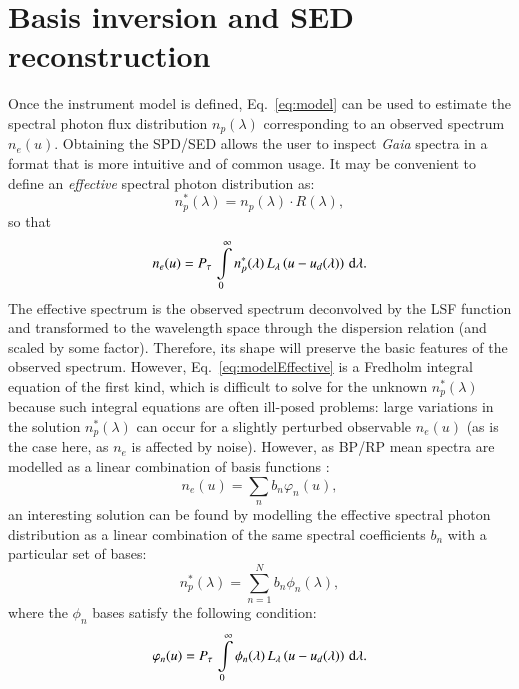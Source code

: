 \documentclass{aa}
\newcommand{\gaia}{\textit{Gaia}\xspace}
\newcommand{\pupil}{\ensuremath{P_\tau}}
\newcommand{\equref}[1]{Eq.~\ref{eq:#1}}
\begin{document}

\section{Basis inversion and SED reconstruction}\label{sec:basisInversion}

Once the instrument model is defined, \equref{model} can be used to estimate the spectral photon flux distribution $n_p(\lambda)$ corresponding to an observed spectrum $n_e(u)$. 
Obtaining the SPD/SED allows the user to inspect \gaia spectra in a format that is more intuitive and of common usage.
It may be convenient to define an 
\emph{effective} spectral photon distribution as:
\begin{equation}
    n_p^*(\lambda) = n_p(\lambda) \cdot R(\lambda)
    \label{eq:effective}
,\end{equation}
so that
\begin{equation}
\label{eq:modelEffective}
n_{e}(u)=  \pupil\, \int\limits_0^\infty n_p^*(\lambda) \, L_\lambda\left(u - u_d(\lambda)\right) \, {\rm d}\lambda
.\end{equation}
The effective spectrum is the observed spectrum deconvolved by the LSF function and transformed to the wavelength space through the dispersion relation (and scaled by some factor). Therefore, its shape will preserve the basic features of the observed spectrum.
However, \equref{modelEffective} is a Fredholm integral equation of the first kind, which is difficult to solve for the unknown $n_p^*(\lambda)$ because such integral equations are often ill-posed problems: large variations in the solution $n_p^*(\lambda)$ can occur for a slightly perturbed observable $n_{e}(u)$ (as is the case here, as   $n_e$ is affected by noise). 
 However, as BP/RP mean spectra are modelled as a linear combination of basis functions \citep{Carrasco2021}:
\begin{equation}
    n_e(u) = \sum_n b_n  \varphi_n(u)
,\end{equation}
an interesting solution can be found by modelling the effective spectral photon distribution as a linear combination of the {same} spectral coefficients $b_n$ with a particular set of bases:
\begin{equation}
    n_p^*(\lambda) = \sum_{n=1}^N b_n \phi_n(\lambda)
,\end{equation}
where the $\phi_n$ bases satisfy the following condition:
\begin{equation}
\label{eq:invBases}
\varphi_n(u)=  \pupil\, \int\limits_0^\infty \phi_n(\lambda) \, L_\lambda\left(u - u_d(\lambda)\right) \, {\rm d}\lambda
.\end{equation}
\end{document}
